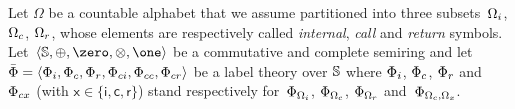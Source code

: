\noindent
\label{sec:SWVPA-def}
Let $\Omega$ be a countable alphabet
that we assume partitioned into three
subsets~$\Omegai$, $\Omegac$, $\Omegar$,
whose elements are respectively called
\emph{internal}, \emph{call} and \emph{return} symbols.
Let~$\< \Semiring, \oplus, \zero, \otimes, \one>$ be a commutative and complete semiring and let
$\bar\Phi = \< \Phii, \Phic, \Phir, \Phici, \Phicc, \Phicr>$
be a label theory over $\mathbb{S}$
where $\Phii$, $\Phic$, $\Phir$ and~$\Phicx$ (with $\mathsf{x} \in \{ \mathsf{i}, \mathsf{c}, \mathsf{r}\}$)
stand respectively
for~$\Phi_\Omegai$, $\Phi_\Omegac$, $\Phi_\Omegar$ and~$\Phi_{\Omegac, \Omega_\mathsf{x}}$.
%

